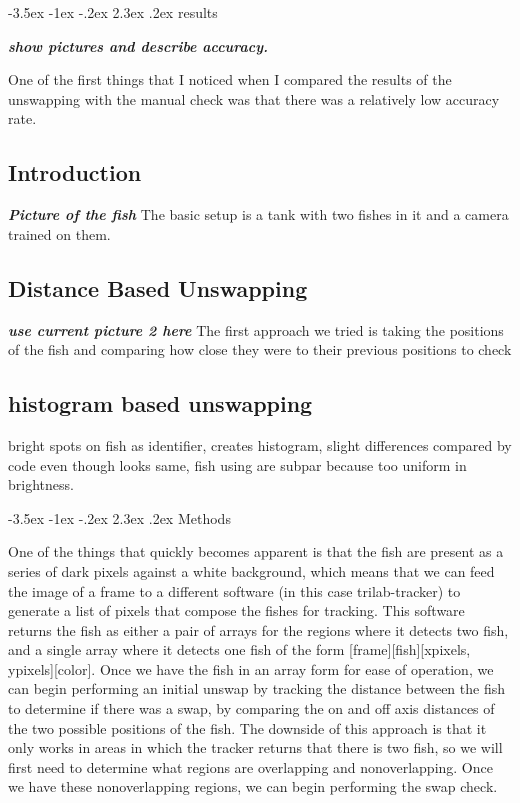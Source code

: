 \documentclass{article}
\makeatletter
\renewcommand\section{\clearpage\newpage\@startsection {section}{1}{\z@}%
	{-3.5ex \@plus -1ex \@minus -.2ex}%
	{2.3ex \@plus.2ex}%
	{\normalfont\Large\bfseries}}
\makeatother
\begin{document}
\section{results}

\textbf{\textit{show pictures and describe accuracy.}}

One of the first things that I noticed when I compared the results of the unswapping with the manual check was that there was a relatively low accuracy rate. 

\subsection{Introduction}
\textbf{\textit{Picture of the fish}}
The basic setup is a tank with two fishes in it and a camera trained on them.

\subsection{Distance Based Unswapping}
\textbf{\textit{use current picture 2 here}}
The first approach we tried is taking the positions of the fish and comparing how close they were to their previous positions to check 

\subsection{histogram based unswapping}
bright spots on fish as identifier, creates histogram, slight differences compared by code even though looks same, fish using are subpar because too uniform in brightness.

\section{Methods}

One of the things that quickly becomes apparent is that the fish are present as a series of dark pixels against a white background, which means that we can feed the image of a frame to a different software (in this case trilab-tracker) to generate a list of pixels that compose the fishes for tracking. This software returns the fish as either a pair of arrays for the regions where it detects two fish, and a single array where it detects one fish of the form [frame][fish][xpixels, ypixels][color]. Once we have the fish in an array form for ease of operation, we can begin performing an initial unswap by tracking the distance between the fish to determine if there was a swap, by comparing the on and off axis distances of the two possible positions of the fish. The downside of this approach is that it only works in areas in which the tracker returns that there is two fish, so we will first need to determine what regions are overlapping and nonoverlapping. Once we have these nonoverlapping regions, we can begin performing the swap check. 
\end{document}
